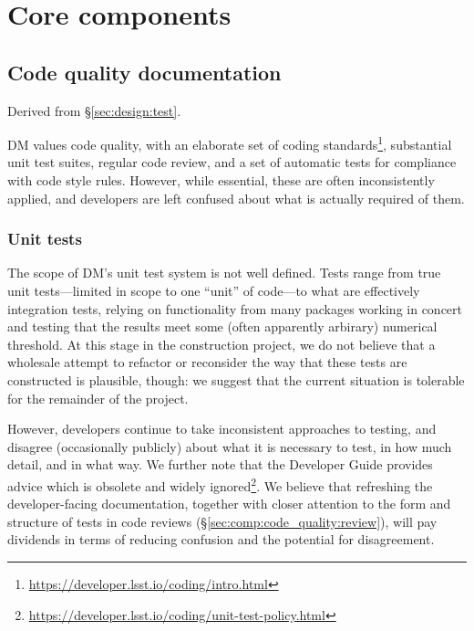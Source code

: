 \section{Core components}
\label{sec:comp}







\subsection{Code quality documentation}
\label{sec:comp:code_quality}

Derived from \S\ref{sec:design:test}.

DM values code quality, with an elaborate set of coding standards\footnote{\url{https://developer.lsst.io/coding/intro.html}}, substantial unit test suites, regular code review, and a set of automatic tests for compliance with code style rules.
However, while essential, these are often inconsistently applied, and developers are left confused about what is actually required of them.

\subsubsection{Unit tests}
\label{sec:comp:code_quality:unittest}

The scope of DM's unit test system is not well defined.
Tests range from true unit tests---limited in scope to one ``unit'' of code---to what are effectively integration tests, relying on functionality from many packages working in concert and testing that the results meet some (often apparently arbirary) numerical threshold.
At this stage in the construction project, we do not believe that a wholesale attempt to refactor or reconsider the way that these tests are constructed is plausible, though: we suggest that the current situation is tolerable for the remainder of the project.

However, developers continue to take inconsistent approaches to testing, and disagree (occasionally publicly) about what it is necessary to test, in how much detail, and in what way.
We further note that the Developer Guide provides advice which is obsolete and widely ignored\footnote{\url{https://developer.lsst.io/coding/unit-test-policy.html}}.
We believe that refreshing the developer-facing documentation, together with closer attention to the form and structure of tests in code reviews (\S\ref{sec:comp:code_quality:review}), will pay dividends in terms of reducing confusion and the potential for disagreement.

